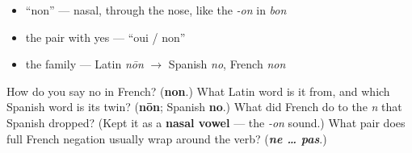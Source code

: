 \begin{itemize}
\raggedright
  \item \textquotedblleft{}non\textquotedblright{} — nasal, through the nose, like the \emph{-on} in \emph{bon}
  \item the pair with yes — \textquotedblleft{}oui / non\textquotedblright{}
  \item the family — Latin \emph{nōn} $\to$ Spanish \emph{no}, French \emph{non}
\end{itemize}

\begin{tcolorbox}[breakable,colback=teal!4,colframe=teal!35!black,title={Before you move on}]
How do you say no in French? (\textbf{non}.) What Latin word is it from, and which Spanish word is its twin? (\textbf{nōn}; Spanish \textbf{no}.) What did French do to the \emph{n} that Spanish dropped? (Kept it as a \textbf{nasal vowel} — the \emph{-on} sound.) What pair does full French negation usually wrap around the verb? (\emph{\textbf{ne … pas}}.)
\end{tcolorbox}
